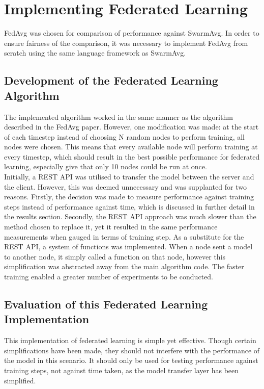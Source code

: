 \section{Implementing Federated Learning}
FedAvg was chosen for comparison of performance against SwarmAvg. In order to ensure fairness of the comparison, it was necessary to implement FedAvg from scratch using the same language framework as SwarmAvg.
\subsection{Development of the Federated Learning Algorithm}
The implemented algorithm worked in the same manner as the algorithm described in the FedAvg paper. However, one modification was made: at the start of each timestep instead of choosing N random nodes to perform training, all nodes were chosen. This means that every available node will perform training at every timestep, which should result in the best possible performance for federated learning, especially give that only 10 nodes could be run at once. \\

Initially, a REST API was utilised to transfer the model between the server and the client. However, this was deemed unnecessary and was supplanted for two reasons. Firstly, the decision was made to measure performance against training steps instead of performance against time, which is discussed in further detail in the results section. Secondly, the REST API approach was much slower than the method chosen to replace it, yet it resulted in the same performance measurements when gauged in terms of training step. As a substitute for the REST API, a system of functions was implemented. When a node sent a model to another node, it simply called a function on that node, however this simplification was abstracted away from the main algorithm code. The faster training  enabled a greater number of experiments to be conducted.

\subsection{Evaluation of this Federated Learning Implementation}
This implementation of federated learning is simple yet effective. Though certain simplifications have been made, they should not interfere with the performance of the model in this scenario. It should only be used for testing performance against training steps, not against time taken, as the model transfer layer has been simplified.

